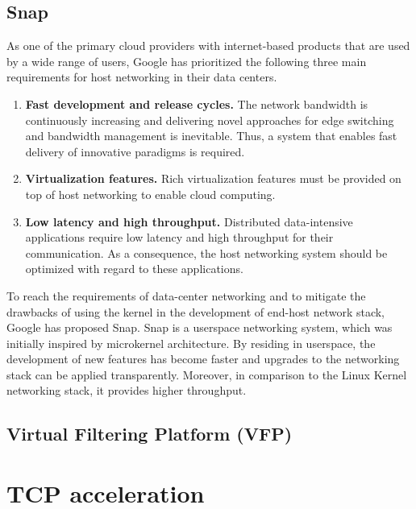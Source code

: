 \subsection{Snap}
\label{snap}

As one of the primary cloud providers with internet-based products that are used by a wide 
range of users, Google has prioritized the following three main requirements for host 
networking in their data centers. 

\begin{enumerate}
    \item \textbf{Fast development and release cycles.} The network bandwidth is continuously 
    increasing and delivering novel approaches for edge switching and bandwidth management is 
    inevitable. Thus, a system that enables fast delivery of innovative paradigms is required.

    \item \textbf{Virtualization features.} Rich virtualization features must be provided on 
    top of host networking to enable cloud computing.

    \item \textbf{Low latency and high throughput.} Distributed data-intensive applications 
    require low latency and high throughput for their communication. As a consequence, the 
    host networking system should be optimized with regard to these applications.

\end{enumerate}

To reach the requirements of data-center networking and to mitigate the drawbacks of using 
the kernel in the development of end-host network stack, Google has proposed Snap. Snap is 
a userspace networking system, which was initially inspired by microkernel architecture. 
By residing in userspace, the development of new features has become faster and upgrades to
the networking stack can be applied transparently. Moreover, in comparison to the Linux Kernel 
networking stack, it provides higher throughput.

\subsection{Virtual Filtering Platform (VFP)}
\label{vfp}


\section{TCP acceleration}



